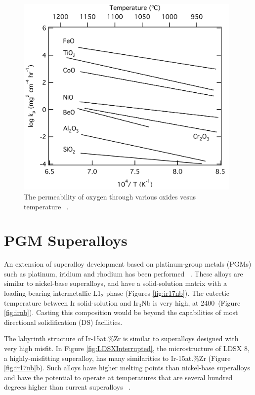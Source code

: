 %
\begin{figure}[H]
\begin{center}
\includegraphics[width=11cm]{oxides}
\caption{The permeability of oxygen through various oxides vesus temperature ~\cite{nesbitt93}.}
\label{fig:oxidepermeability}
\end{center}
\end{figure}
%

\section{PGM Superalloys}

An extension of superalloy development based on platinum-group metals (PGMs) such as platinum, iridium and rhodium has been performed ~\cite{wenderoth05, mitarai98, mitarai97, mitarai99}.  These alloys are similar to nickel-base superalloys, and have a solid-solution matrix with a loading-bearing intermetallic L1$_2$ phase (Figures \ref{fig:ir17nb}).  The eutectic temperature between Ir solid-solution and Ir$_3$Nb is very high, at 2400\celsius\ (Figure \ref{fig:irnb}).  Casting this composition would be beyond the capabilities of most directional solidification (DS) facilities.  

The labyrinth structure of Ir-15at.\%Zr is similar to superalloys designed with very high misfit.  In Figure \ref{fig:LDSXInterrupted}, the microstructure of LDSX 8, a highly-misfitting superalloy, has many similarities to Ir-15at.\%Zr (Figure \ref{fig:ir17nb}b).  Such alloys have higher melting points than nickel-base superalloys and have the potential to operate at temperatures that are several hundred degrees higher than current superalloys ~\cite{okamoto94ir}.  

